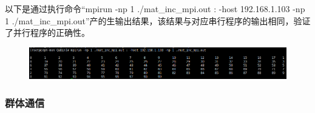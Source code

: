 \documentclass{article}
\begin{document}
					以下是通过执行命令``mpirun -np 1 ./mat\_inc\_mpi.out : -host 192.168.1.103 -np 1 ./mat\_inc\_mpi.out''产的生输出结果，该结果与对应串行程序的输出相同，验证了并行程序的正确性。
					\begin{figure}[H]
						\centering
						\includegraphics[width=1\linewidth]{image/mat_inc_mpi.png}
					\end{figure}
					
				\subsubsection{群体通信}
				
\end{document}
